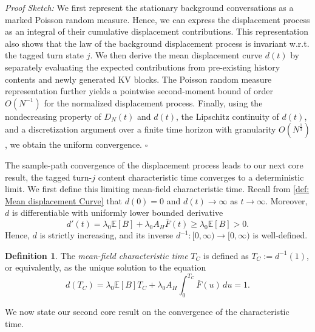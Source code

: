 \documentclass{article}
\theoremstyle{definition}
\newtheorem{definition}[definition]{Definition}
\newcommand{\E}{\mathbb E}
\begin{document}
\noindent\textit{Proof Sketch:} We first represent the stationary background conversations as a marked Poisson random measure. Hence, we can express the displacement process as an integral of their cumulative displacement contributions. This representation also shows that the law of the background displacement process is invariant w.r.t. the tagged turn state $j$. We then derive the mean displacement curve $d(t)$ by separately evaluating the expected contributions from pre-existing history contents and newly generated KV blocks. The Poisson random measure representation further yields a pointwise second-moment bound of order $O(N^{-1})$ for the normalized displacement process. Finally, using the nondecreasing property of $D_N(t)$ and $d(t)$, the Lipschitz continuity of $d(t)$, and a discretization argument over a finite time horizon with granularity $O(N^{\frac{1}{3}})$, we obtain the uniform convergence. \hfill $\square$


The sample-path convergence of the displacement process leads to our next core result, the tagged turn-$j$ content characteristic time converges to a deterministic limit. We first define this limiting mean-field characteristic time. Recall from \cref{def: Mean displacement Curve} that $d(0)=0$ and $d(t)\rightarrow\infty$ as $t\rightarrow\infty$. Moreover, $d$ is differentiable with uniformly lower bounded derivative 
\begin{equation*}
    d'(t)=\lambda_0\E[B]+\lambda_0A_H\bar F(t) \geq \lambda_0\E[B]>0.
\end{equation*}
Hence, $d$ is strictly increasing, and its inverse $d^{-1}:[0,\infty)\rightarrow[0,\infty)$ is well-defined.
\begin{definition}
    \label{def: deterministic mean-field characteristic time}
    The \emph{mean-field characteristic time} $T_C$ is defined as $T_C:=d^{-1}(1)$, or equivalently, as the unique solution to the equation
    \begin{equation}
        \label{equ: mean displacement curve solution to 1}
        d(T_C)=\lambda_0\E[B]T_C+\lambda_0A_H\int_0^{T_C}\bar F(u)\,du=1.
    \end{equation}
\end{definition}


We now state our second core result on the convergence of the characteristic time.
\end{document}

